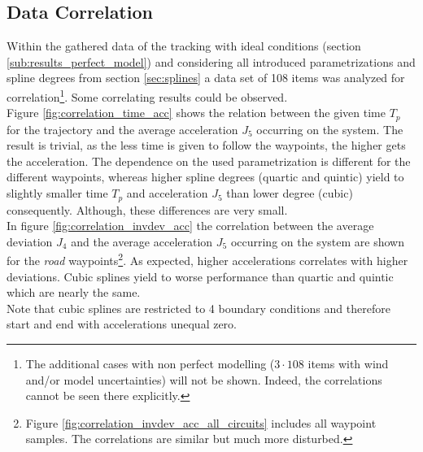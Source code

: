 \subsection{Data Correlation}
Within the gathered data of the tracking with ideal conditions (section \ref{sub:results_perfect_model}) and considering all introduced parametrizations and spline degrees from section \ref{sec:splines} a data set of 108 items was analyzed for correlation\footnote{The additional cases with non perfect modelling ($3\cdot 108$ items with wind and/or model uncertainties) will not be shown. Indeed, the correlations cannot be seen there explicitly.}. Some correlating results could be observed. \\
Figure \ref{fig:correlation_time_acc} shows the relation between the given time $T_p$ for the trajectory and the average acceleration $J_5$ occurring on the system. The result is trivial, as the less time is given to follow the waypoints, the higher gets the acceleration. The dependence on the used parametrization is different for the different waypoints, whereas higher spline degrees (quartic and quintic) yield to slightly smaller time $T_p$ and acceleration $J_5$ than lower degree (cubic) consequently. Although, these differences are very small. \\
In figure \ref{fig:correlation_invdev_acc} the correlation between the average deviation $J_4$ and the average acceleration $J_5$ occurring on the system are shown for the \textit{road} waypoints\footnote{Figure \ref{fig:correlation_invdev_acc_all_circuits} includes all waypoint samples. The correlations are similar but much more disturbed.}. As expected, higher accelerations correlates with higher deviations. Cubic splines yield to worse performance than quartic and quintic which are nearly the same.
\\ Note that cubic splines are restricted to \num{4} boundary conditions and therefore start and end with accelerations unequal zero. 


